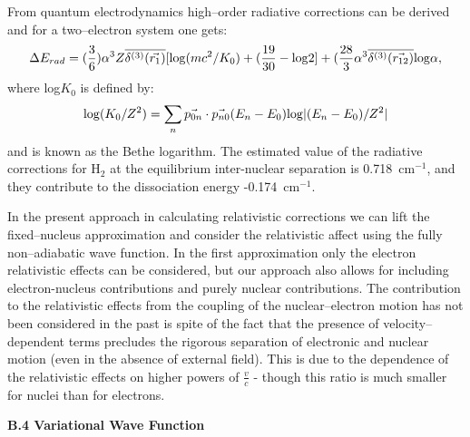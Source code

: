 From quantum electrodynamics high--order radiative corrections can 
be derived and for a two--electron system one gets:\cite{k15}
\begin{equation}
\Delta E_{rad} = (\frac{3}{6})
\alpha^3 Z \overline{\delta^{(3)} (\vec{r_1})}
[{\rm log}(mc^2/K_0) + (\frac{19}{30} - {\rm log}2]
+ (\frac{28}{3} \alpha^3 \overline{\delta^{(3)}(\vec{r_{12}})}
{\rm log} \alpha,
\end{equation}
where log$K_0$ is defined by:
\begin{equation}
[\sum_{n} \vec{p_{0n}} \cdot \vec{p_{n0}}(E_n - E_0)]
{\rm log} (K_0 / Z^2) =
\sum_n \vec{p_{0n}} \cdot \vec{p_{n0}} 
(E_n - E_0) {\rm log} |(E_n - E_0)/Z^2|
\end{equation}
and is known as the Bethe logarithm. 
The estimated value of the radiative corrections for H$_2$ at  the 
equilibrium inter-nuclear separation is 0.718~cm$^{-1}$,
and they contribute to the dissociation energy -0.174~cm$^{-1}$.
\cite{kk}

In the present approach in calculating relativistic 
corrections we can lift the fixed--nucleus approximation
and consider the relativistic affect using
the fully non--adiabatic wave function. 
In the first approximation only the electron 
relativistic effects can be considered, but our
approach also allows for including electron-nucleus
contributions and purely nuclear contributions.
The contribution to the relativistic effects from
the coupling of the nuclear--electron motion has not been
considered in the past is spite of the fact that the
presence of velocity--dependent terms
precludes the rigorous separation of electronic
and nuclear motion (even in the absence of external field).
This is due to the dependence of the relativistic
effects on higher powers of $\frac{v}{c}$ - though
this ratio is much smaller for nuclei than for
electrons. 



\vspace{2mm}
\noindent
{\bf B.4 Variational Wave Function}



